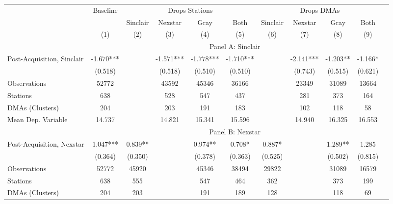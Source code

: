 {\def \sym#1{\ifmmode^{#1}\else\(^{#1}\)\fi} \begin{tabular}{l*{10}{c}} \toprule \ & \multicolumn{1}{c}{Baseline} & \multicolumn{4}{c}{Drops Stations}   & \multicolumn{4}{c}{Drops DMAs} \\ \cmidrule(lr){2-2}\cmidrule(lr){3-6}\cmidrule(lr){7-10} \ & 
 & Sinclair & Nexstar & Gray & Both & Sinclair & Nexstar & Gray & Both \\  \ & (1) & (2) & (3) & (4) & (5) & (6)  & (7)  & (8)  & (9) \\
\midrule \ & \multicolumn{9}{c}{Panel A: Sinclair} \\\cmidrule(lr){2-10}
Post-Acquisition, Sinclair&   -1.670***&         &   -1.571***&   -1.778***&   -1.710***&         &   -2.141***&   -1.203** &   -1.166*  \\
                &  (0.518)   &         &  (0.518)   &  (0.510)   &  (0.510)   &         &  (0.743)   &  (0.515)   &  (0.621)   \\
\midrule
Observations    &    52772   &         &    43592   &    45346   &    36166   &         &    23349   &    31089   &    13664   \\
Stations        &      638   &         &      528   &      547   &      437   &         &      281   &      373   &      164   \\
DMAs (Clusters) &      204   &         &      203   &      191   &      183   &         &      102   &      118   &       58   \\
Mean Dep. Variable&   14.737   &         &   14.821   &   15.341   &   15.596   &         &   14.940   &   16.325   &   16.553   \\
\midrule \ & \multicolumn{9}{c}{Panel B: Nexstar} \\\cmidrule(lr){2-10}
Post-Acquisition, Nexstar&    1.047***&    0.839** &         &    0.974** &    0.708*  &    0.887*  &         &    1.289** &    1.285   \\
                &  (0.364)   &  (0.350)   &         &  (0.378)   &  (0.363)   &  (0.525)   &         &  (0.502)   &  (0.815)   \\
\midrule
Observations    &    52772   &    45920   &         &    45346   &    38494   &    29822   &         &    31089   &    16579   \\
Stations        &      638   &      555   &         &      547   &      464   &      362   &         &      373   &      199   \\
DMAs (Clusters) &      204   &      203   &         &      191   &      189   &      128   &         &      118   &       69   \\

\end{tabular}}
